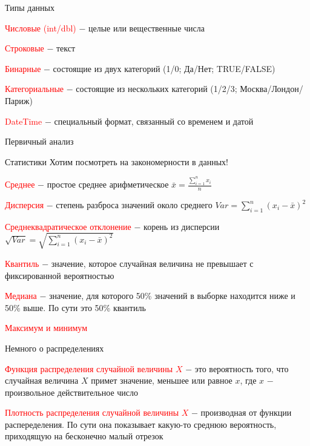 \documentclass[notes,12pt, aspectratio=169]{beamer}
\newenvironment{transitionframe}{
  \setbeamercolor{background canvas}{bg=yellow}
  \begin{frame}}{
    \end{frame}
}
\newenvironment{wideitemize}{\itemize\addtolength{\itemsep}{10pt}}{\enditemize}
\begin{document}
\begin{frame}{Типы данных}
	\begin{wideitemize}
		\item \textcolor{red}{Числовые (int/dbl)} $-$ целые или вещественные числа
		\item \textcolor{red}{Строковые} $-$ текст
		\item \textcolor{red}{Бинарные} $-$ состоящие из двух категорий (1/0; Да/Нет; TRUE/FALSE)
		\item \textcolor{red}{Категориальные} $-$ состоящие из нескольких категорий (1/2/3; Москва/Лондон/Париж)
		\item \textcolor{red}{DateTime} $-$ специальный формат, связанный со временем и датой
	\end{wideitemize}
\end{frame}

\begin{transitionframe}
	\begin{center}
		\Huge Первичный анализ
	\end{center}
\end{transitionframe}

\begin{frame}{Статистики}
	Хотим посмотреть на закономерности в данных!
	\begin{wideitemize}
		\item \textcolor{red}{Среднее} $-$ простое среднее арифметическое $\bar{x} = \frac{\sum_{i=1}^{n}x_i}{n}$
		\item \textcolor{red}{Дисперсия} $-$ степень разброса значений около среднего $Var = \sum_{i=1}^{n} (x_i - \bar{x})^2$
		\item \textcolor{red}{Среднеквадратическое отклонение} $-$ корень из дисперсии $\sqrt{Var} = \sqrt{\sum_{i=1}^{n} (x_i - \bar{x})^2}$
		\item \textcolor{red}{Квантиль} $-$ значение, которое случайная величина не превышает с фиксированной вероятностью
		\item \textcolor{red}{Медиана} $-$ значение, для которого 50\% значений в выборке находится ниже и 50\% выше. По сути это 50\% квантиль 
		\item \textcolor{red}{Максимум и минимум}
	\end{wideitemize}
\end{frame}

\begin{frame}{Немного о распределениях}
	\begin{wideitemize}
		\item \textcolor{red}{Функция распределения случайной величины $X$} $-$ это вероятность того, что случайная величина $X$ примет значение, меньшее или равное $x$, где $x$ $-$ произвольное действительное число
		\item \textcolor{red}{Плотность распределения случайной величины $X$} $-$ производная от функции распеределения. По сути она показывает какую-то среднюю вероятность, приходящую на бесконечно малый отрезок
	\end{wideitemize}
\end{frame}
\end{document}
